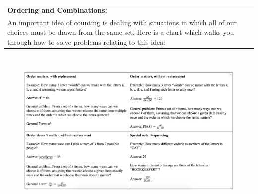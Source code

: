 {
\tabulinesep=1mm
 \begin{tabu}{|p{16cm} |}
 \hline
\textbf{Ordering and Combinations:} \\
An important idea of counting is dealing with situations in which all of our choices must be drawn from the same set. Here is a chart which walks you through how to solve problems relating to this idea:
\\
\hline
 \end{tabu}
}

\begin{figure}[!ht]
\includegraphics[width=16.5cm, height=8cm]{counting_chart.png}
\end{figure}
